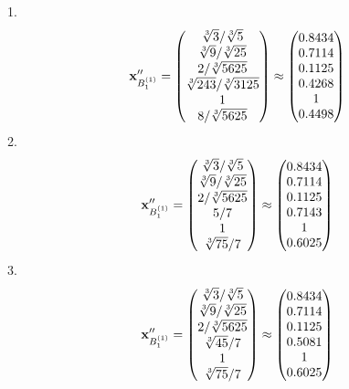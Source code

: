 \documentclass[10pt,a4paper]{article}
\begin{document}
	1.
	\[
		\bold{x}''_{B_1^{(1)}} = 
		\begin{pmatrix}
			{\sqrt[3]{3}} / {\sqrt[3]{5}} \\
			{\sqrt[3]{9}} / {\sqrt[3]{25}} \\
			{{2}} / {\sqrt[3]{5625}} \\
			{\sqrt[3]{243}} / {\sqrt[3]{3125}} \\
			{1}{} \\
			{{8}} / {\sqrt[3]{5625}} \\
		\end{pmatrix}
		\approx
		\begin{pmatrix}
			0.8434   \\
			0.7114   \\
			0.1125   \\
			0.4268   \\
			1        \\
			0.4498   \\
		\end{pmatrix}
	\]
	2.
	\[
		\bold{x}''_{B_1^{(1)}} = 
		\begin{pmatrix}
			{\sqrt[3]{3}} / {\sqrt[3]{5}} \\
			{\sqrt[3]{9}} / {\sqrt[3]{25}} \\
			{{2}} / {\sqrt[3]{5625}} \\
			{{5}} / {{7}} \\
			{1}{} \\
			{\sqrt[3]{75}} / {{7}} \\
		\end{pmatrix}
		\approx
		\begin{pmatrix}
			0.8434   \\
			0.7114   \\
			0.1125   \\
			0.7143   \\
			1        \\
			0.6025   \\
		\end{pmatrix}
	\]
	3.
	\[
		\bold{x}''_{B_1^{(1)}} = 
		\begin{pmatrix}
			{\sqrt[3]{3}} / {\sqrt[3]{5}} \\
			{\sqrt[3]{9}} / {\sqrt[3]{25}} \\
			{{2}} / {\sqrt[3]{5625}} \\
			{\sqrt[3]{45}} / {{7}} \\
			{1}{} \\
			{\sqrt[3]{75}} / {{7}} \\
		\end{pmatrix}
		\approx
		\begin{pmatrix}
			0.8434   \\
			0.7114   \\
			0.1125   \\
			0.5081   \\
			1        \\
			0.6025   \\
		\end{pmatrix}
	\]
\end{document}
